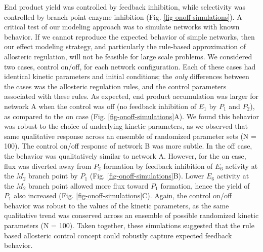 \documentclass[12pt]{article}
\begin{document}
End product yield was controlled by feedback inhibition, while selectivity was controlled by branch point enzyme inhibition (Fig. \ref{fig-onoff-simulations}).
A critical test of our modeling approach was to simulate networks with known behavior. If we cannot reproduce the expected behavior of simple networks, then our
effect modeling strategy, and particularly the rule-based approximation of allosteric regulation, will not be feasible for large scale problems.
We considered two cases,  control on/off, for each network configuration. 
Each of these cases had identical kinetic parameters and initial conditions; 
the \textit{only} differences between the cases was the allosteric regulation rules, and the control parameters associated with these rules. 
As expected, end product accumulation was larger for network A when the control was off (no feedback inhibition of $E_{1}$ by $P_{1}$ and $P_{2}$),
as compared to the on case (Fig. \ref{fig-onoff-simulations}A). We found this behavior was robust to the choice of underlying kinetic parameters, 
as we observed that same qualitative response across an ensemble of randomized parameter sets (N = 100). 
The control on/off response of network B was more subtle. In the off case, the behavior was qualitatively similar to network A. 
However, for the on case, flux was diverted away from $P_{2}$ formation by feedback inhibition of $E_{6}$ activity at the $M_{2}$ branch point by $P_{1}$ (Fig. \ref{fig-onoff-simulations}B).
Lower $E_{6}$ activity at the $M_{2}$ branch point allowed more flux toward $P_{1}$ formation, hence the yield of $P_{1}$ also increased (Fig. \ref{fig-onoff-simulations}C).
Again, the control on/off behavior was robust to the values of the kinetic parameters, as the same qualitative trend was conserved across 
an ensemble of possible randomized kinetic parameters (N = 100). Taken together, these simulations suggested that the rule based allosteric control 
concept could robustly capture expected feedback behavior.
\end{document}
